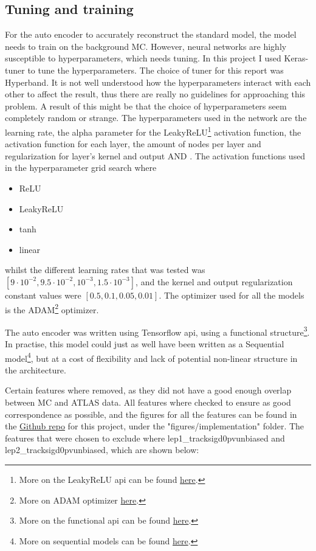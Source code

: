 \documentclass[ reprint, amsmath,amssymb, aps, nofootinbib]{revtex4-2}
\begin{document}
 

\subsection{Tuning and training}
For the auto encoder to accurately reconstruct the standard model, the model needs to train on the background MC. However, neural networks are highly susceptible to hyperparameters, which needs tuning. In this project I used Keras-tuner\cite{omalley2019kerastuner} to tune the hyperparameters. The choice of tuner for this report was Hyperband\cite{JMLR:v18:16-558}. It is not well understood how the hyperparameters interact with each other to affect the result, thus there are really no guidelines for approaching this problem. A result of this might be that the choice of hyperparameters seem completely random or strange. The hyperparameters used in the network are the learning rate, the alpha parameter for the LeakyReLU\footnote{More on the LeakyReLU api can be found \href{https://www.tensorflow.org/api_docs/python/tf/keras/layers/LeakyReLU}{here}.} activation function, the activation function for each layer, the amount of nodes per layer and regularization for layer's kernel and output AND . The activation functions used in the hyperparameter grid search where
\begin{itemize}
    \item ReLU
    \item LeakyReLU
    \item tanh
    \item linear
\end{itemize}
whilst the different learning rates that was tested was $[9\cdot 10^{-2}, 9.5\cdot 10^{-2}, 10^{-3}, 1.5\cdot 10^{-3}]$, and the kernel and output regularization constant values were $[0.5, 0.1, 0.05, 0.01]$. The optimizer used for all the models is the ADAM\footnote{More on ADAM optimizer \href{https://www.tensorflow.org/api_docs/python/tf/keras/optimizers/Adam}{here}.} optimizer. \par 
The auto encoder was written using Tensorflow api\cite{tensorflow2015-whitepaper}\cite{chollet2015keras}, using a functional structure\footnote{More on the functional api can be found \href{https://www.tensorflow.org/guide/keras/functional}{here}.}. In practise, this model could just as well have been written as a Sequential model\footnote{More on sequential models can be found \href{https://www.tensorflow.org/guide/keras/sequential_model}{here}.}, but at a cost of flexibility and lack of potential non-linear structure in the architecture. \par 
Certain features where removed, as they did not have a good enough overlap between MC and ATLAS data. All features where checked to ensure as good correspondence as possible, and the figures for all the features can be found in the \href{https://github.com/Gadangadang/FYS5555/tree/main/Project3}{Github repo} for this project, under the "figures/implementation" folder. The features that were chosen to exclude where lep1\_tracksigd0pvunbiased and lep2\_tracksigd0pvunbiased, which are shown below:
\end{document}
